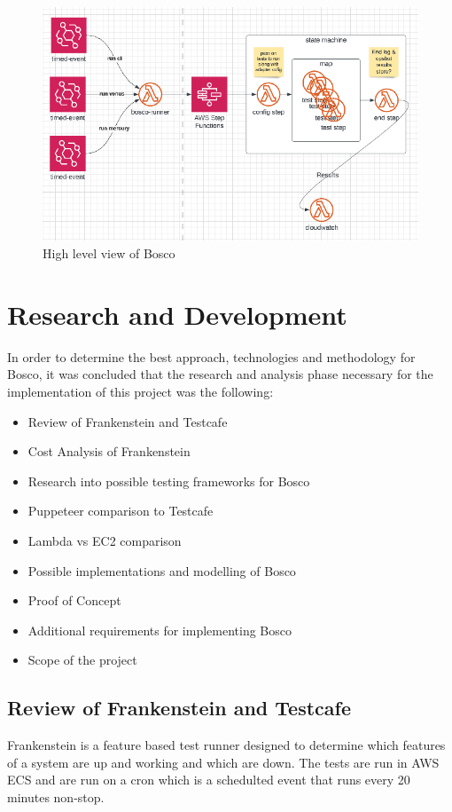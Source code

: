 \documentclass[12pt,a4paper,titlepage]{report}
\begin{document}
\begin{figure}[ht]
 \centering
 \includegraphics[width=\textwidth,height=\textheight,keepaspectratio]{./diagrams/bosco_high_level.png}
 \caption{High level view of Bosco}
\end{figure}

\chapter{Research and Development}

In order to determine the best approach, technologies and methodology for Bosco, it was concluded that the research and analysis phase necessary for the implementation of this project was the following:

\begin{itemize}
 \item Review of Frankenstein and Testcafe
 \item Cost Analysis of Frankenstein
 \item Research into possible testing frameworks for Bosco
 \item Puppeteer comparison to Testcafe
 \item Lambda vs EC2 comparison
 \item Possible implementations and modelling of Bosco
 \item Proof of Concept
 \item Additional requirements for implementing Bosco
 \item Scope of the project
\end{itemize}

\section{Review of Frankenstein and Testcafe}
Frankenstein is a feature based test runner designed to determine
which features of a system are up and working and which are down.
The tests are run in AWS ECS and are run on a cron which is a schedulted event that runs every 20 minutes non-stop.
\end{document}
